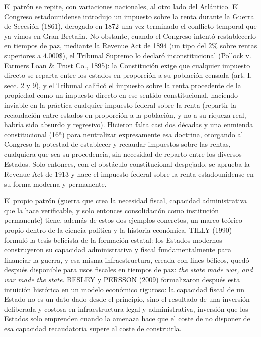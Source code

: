 \documentclass[10pt,a4paper]{article}
\begin{document}
El patrón se repite, con variaciones nacionales, al otro lado del Atlántico. El Congreso estadounidense introdujo un impuesto sobre la renta durante la Guerra de Secesión (1861), derogado en 1872 una vez terminado el conflicto temporal que ya vimos en Gran Bretaña. No obstante, cuando el Congreso intentó restablecerlo en tiempos de paz, mediante la Revenue Act de 1894 (un tipo del $2\%$ sobre rentas superiores a $4.000\$$), el Tribunal Supremo lo declaró inconstitucional (Pollock v. Farmers Loan \& Trust Co., 1895): la Constitución exige que cualquier impuesto directo se reparta entre los estados en proporción a su población censada (art. I, secc. 2 y 9), y el Tribunal calificó el impuesto sobre la renta procedente de la propiedad como un impuesto directo en ese sentido constitucional, haciendo inviable en la práctica cualquier impuesto federal sobre la renta (repartir la recaudación entre estados en proporción a la población, y no a su riqueza real, habría sido absurdo y regresivo). Hicieron falta casi dos décadas y una enmienda constitucional (16ª) para neutralizar expresamente esa doctrina, otorgando al Congreso la potestad de establecer y recaudar impuestos sobre las rentas, cualquiera que sea su procedencia, sin necesidad de reparto entre los diversos Estados. Solo entonces, con el obstáculo constitucional despejado, se aprueba la Revenue Act de 1913 y nace el impuesto federal sobre la renta estadounidense en su forma moderna y permanente.

El propio patrón (guerra que crea la necesidad fiscal, capacidad administrativa que la hace verificable, y solo entonces consolidación como institución permanente) tiene, además de estos dos ejemplos concretos, un marco teórico propio dentro de la ciencia política y la historia económica. TILLY (1990) formuló la tesis belicista de la formación estatal: los Estados modernos construyeron su capacidad administrativa y fiscal fundamentalmente para financiar la guerra, y esa misma infraestructura, creada con fines bélicos, quedó después disponible para usos fiscales en tiempos de paz: \textit{the state made war, and war made the state}. BESLEY y PERSSON (2009) formalizaron después esta intuición histórica en un modelo económico riguroso: la capacidad fiscal de un Estado no es un dato dado desde el principio, sino el resultado de una inversión deliberada y costosa en infraestructura legal y administrativa, inversión que los Estados solo emprenden cuando la amenaza hace que el coste de no disponer de esa capacidad recaudatoria supere al coste de construirla. 
\end{document}
